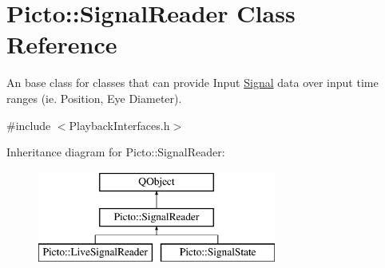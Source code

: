 \hypertarget{class_picto_1_1_signal_reader}{\section{Picto\-:\-:Signal\-Reader Class Reference}
\label{class_picto_1_1_signal_reader}
}


An base class for classes that can provide Input \hyperlink{class_picto_1_1_signal}{Signal} data over input time ranges (ie. Position, Eye Diameter).  




{\ttfamily \#include $<$Playback\-Interfaces.\-h$>$}

Inheritance diagram for Picto\-:\-:Signal\-Reader\-:\begin{figure}[H]
\begin{center}
\leavevmode
\includegraphics[height=3.000000cm]{class_picto_1_1_signal_reader}
\end{center}
\end{figure}
